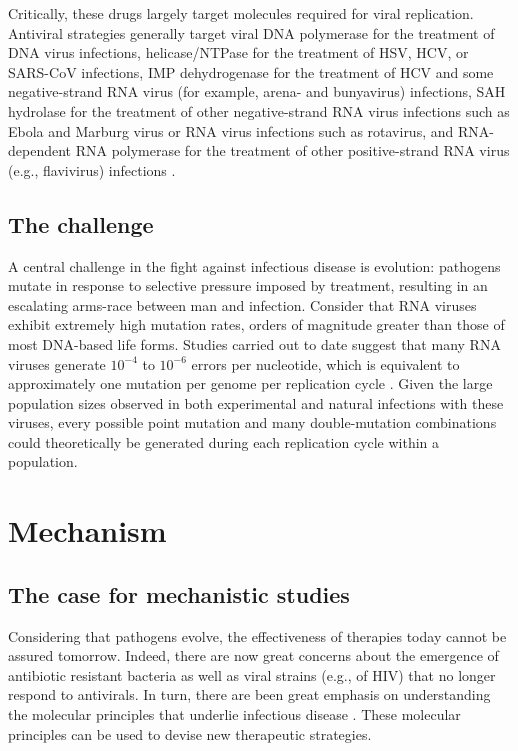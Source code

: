 Critically, these drugs largely target molecules required for viral replication. Antiviral strategies generally target viral DNA polymerase for the treatment of DNA virus infections, helicase/NTPase for the treatment of HSV, HCV, or SARS-CoV infections, IMP dehydrogenase for the treatment of HCV and some negative-strand RNA virus (for example, arena- and bunyavirus) infections, SAH hydrolase for the treatment of other negative-strand RNA virus infections such as Ebola and Marburg virus or RNA virus infections such as rotavirus, and RNA-dependent RNA polymerase for the treatment of other positive-strand RNA virus (e.g., flavivirus) infections \cite{Clercq:2004ba}.

\subsection{The challenge}

A central challenge in the fight against infectious disease is evolution: pathogens mutate in response to selective pressure imposed by treatment, resulting in an escalating arms-race between man and infection. Consider that RNA viruses exhibit extremely high mutation rates, orders of magnitude greater than those of most DNA-based life forms. Studies carried out to date suggest that many RNA viruses generate $10^{-4}$ to $10^{-6}$ errors per nucleotide, which is equivalent to approximately one mutation per genome per replication cycle \cite{Lauring:2013iq}. Given the large population sizes observed in both experimental and natural infections with these viruses, every possible point mutation and many double-mutation combinations could theoretically be generated during each replication cycle within a population.

\section{Mechanism}

\subsection{The case for mechanistic studies}

Considering that pathogens evolve, the effectiveness of therapies today cannot be assured tomorrow. Indeed, there are now great concerns about the emergence of antibiotic resistant bacteria as well as viral strains (e.g., of HIV) that no longer respond to antivirals. In turn, there are been great emphasis on understanding the molecular principles that underlie infectious disease  \cite{Fox:2014fj}. These molecular principles can be used to devise new therapeutic strategies. 

